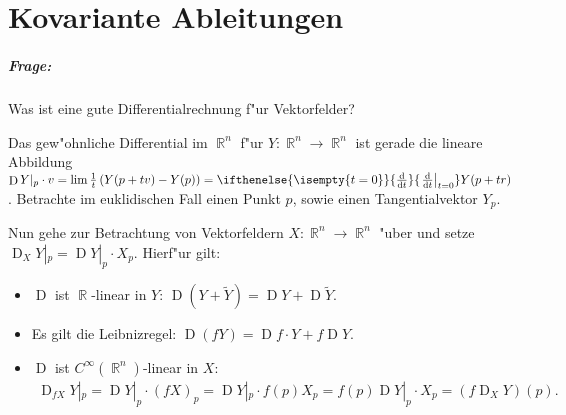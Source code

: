 \documentclass[paper=A4, twoside, chapterprefix=true, bibliography=totoc, headsepline]{scrbook}
\DeclareMathOperator{\R}{\mathbb{R}}
\DeclareMathOperator{\D}{D} %
\newcommand{\dop}{\mathrm{d}}
\newcommand{\difffrac}[3][]{\ifthenelse{\isempty{#1}}{\frac{\dop #2}{\dop #3}}{\left. \frac{\dop #2}{\dop #3} \right|_{#1}}}
\theoremstyle{plain}
\theoremstyle{nonumberplain}
\theoremstyle{empty}
\theoremstyle{break}
\newcommand{\quot}[1]{\textrm{\glqq}{#1}\textrm{\grqq}}
\begin{document}



\chapter{Kovariante Ableitungen}

\paragraph{Frage:} Was ist eine \quot{gute} Differentialrechnung f"ur Vektorfelder?

Das gew"ohnliche Differential im $\R^n$ f"ur $Y \colon \R^n \to \R^n$ ist gerade die lineare Abbildung $\D Y|_p \cdot v = \lim \frac{1}t \left(Y(p+tv) -Y(p)\right) = \difffrac[t=0]{}{t} Y(p+tr)$.
Betrachte im euklidischen Fall einen Punkt $p$, sowie einen Tangentialvektor $Y_p$.
\begin{center}\end{center}

Nun gehe zur Betrachtung von Vektorfeldern $X \colon \R^n \to \R^n$ "uber und setze $\D_XY|_p = \D Y|_p\cdot X_p$. Hierf"ur gilt:
\begin{itemize}
\item $\D$ ist $\R$-linear in $Y$: $\D(Y + \tilde Y) = \D Y + \D \tilde Y$.
\item Es gilt die Leibnizregel: $\D(fY) = \D f \cdot Y + f\D Y$.
\item $\D$ ist $C^{\infty}(\R^n)$-linear in $X$:
  \begin{align*}
    \D_{fX}Y|_p = \D Y|_p\cdot(fX)_p = \D Y|_p \cdot f(p)X_p = f(p) \D Y|_p \cdot X_p = (f \D_XY)(p).
  \end{align*}
\end{itemize}
\end{document}

